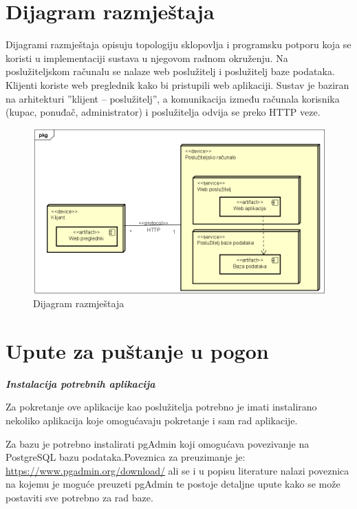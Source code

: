 			
			\section{Dijagram razmještaja}
		
		Dijagrami razmještaja opisuju topologiju sklopovlja i programsku potporu koja se koristi u implementaciji sustava u njegovom radnom okruženju. Na poslužiteljskom računalu se nalaze web poslužitelj i poslužitelj baze podataka. Klijenti koriste web preglednik kako bi pristupili web aplikaciji. Sustav je baziran na arhitekturi ”klijent – poslužitelj”, a komunikacija između računala korisnika (kupac, ponuđač, administrator) i poslužitelja odvija se preko HTTP veze. 
		
		\begin{figure}[H]
				\includegraphics[scale=0.7]{slike/DijagramRazmjestaja.PNG} %
				\centering
				\caption{Dijagram razmještaja}
				\label{fig:java}
			\end{figure}
			
			\eject
			
		\section{Upute za puštanje u pogon}
		
			\textbf{\textit{Instalacija potrebnih aplikacija}}
			
			Za pokretanje ove aplikacije kao poslužitelja potrebno je imati instalirano nekoliko aplikacija koje omogućavaju pokretanje i sam rad aplikacije.
		
			Za bazu je potrebno instalirati pgAdmin koji omogućava povezivanje na PostgreSQL bazu podataka.Poveznica za preuzimanje je: \url{https://www.pgadmin.org/download/} ali se i u  popisu literature nalazi poveznica na kojemu je moguće preuzeti pgAdmin te postoje detaljne upute kako se može postaviti sve potrebno za rad baze.
		
